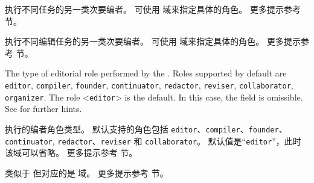 \begin{fieldlist}


执行不同任务的另一类次要编者。
可使用  域来指定具体的角色。
更多提示参考  节。




执行不同编辑任务的另一类次要编者。
可使用  域来指定具体的角色。
更多提示参考  节。



The type of editorial role performed by the . Roles supported by default are \texttt{editor}, \texttt{compiler}, \texttt{founder}, \texttt{continuator}, \texttt{redactor}, \texttt{reviser}, \texttt{collaborator}, \texttt{organizer}. The role <\texttt{editor}> is the default. In this case, the field is omissible. See  for further hints.


 执行的编者角色类型。
默认支持的角色包括 \texttt{editor}、\texttt{compiler}、\texttt{founder}、\texttt{continuator}, \texttt{redactor}、\texttt{reviser} 和 \texttt{collaborator}。
默认值是“\texttt{editor}”，此时该域可以省略。
更多提示参考  节。




类似于  但对应的是  域。
更多提示参考  节。


\end{fieldlist}
